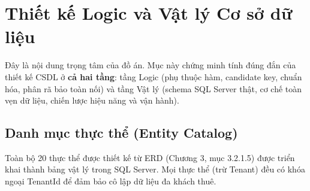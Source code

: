 \section{Thiết kế Logic và Vật lý Cơ sở dữ liệu}

Đây là nội dung trọng tâm của đồ án. Mục này chứng minh tính đúng đắn của thiết kế CSDL ở \textbf{cả hai tầng}: tầng Logic (phụ thuộc hàm, candidate key, chuẩn hóa, phân rã bảo toàn nối) và tầng Vật lý (schema SQL Server thật, cơ chế toàn vẹn dữ liệu, chiến lược hiệu năng và vận hành).

\subsection{Danh mục thực thể (Entity Catalog)}
Toàn bộ 20 thực thể được thiết kế từ ERD (Chương 3, mục 3.2.1.5) được triển khai thành bảng vật lý trong SQL Server. Mọi thực thể (trừ Tenant) đều có khóa ngoại TenantId để đảm bảo cô lập dữ liệu đa khách thuê.

